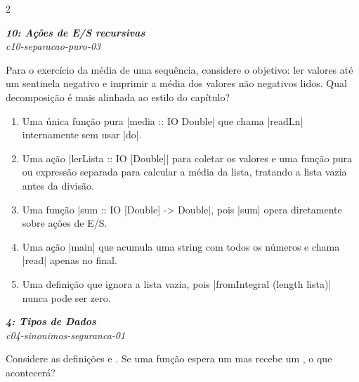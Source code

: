 \documentclass[a4paper,10pt,brazil]{article}
\begin{document}
\begin{multicols}{2}
\begin{enumerate}
\end{enumerate}

\begin{flushright}
  \footnotesize
  \textit{\textbf{10: Ações de E/S recursivas}}\\
  \textit{c10-separacao-puro-03}\\

\end{flushright}
Para o exercício da média de uma sequência, considere o objetivo: ler valores até um sentinela negativo e imprimir a média dos valores não negativos lidos. Qual decomposição é mais alinhada ao estilo do capítulo?

\begin{enumerate}
  \item Uma única função pura \haskellinline|media :: IO Double| que chama \haskellinline|readLn| internamente sem usar \haskellinline|do|.

  \item Uma ação \haskellinline|lerLista :: IO [Double]| para coletar os valores e uma função pura ou expressão separada para calcular a média da lista, tratando a lista vazia antes da divisão.

  \item Uma função \haskellinline|sum :: IO [Double] -> Double|, pois \haskellinline|sum| opera diretamente sobre ações de E/S.

  \item Uma ação \haskellinline|main| que acumula uma string com todos os números e chama \haskellinline|read| apenas no final.

  \item Uma definição que ignora a lista vazia, pois \haskellinline|fromIntegral (length lista)| nunca pode ser zero.


\end{enumerate}

\begin{flushright}
  \footnotesize
  \textit{\textbf{4: Tipos de Dados}}\\
  \textit{c04-sinonimos-seguranca-01}\\

\end{flushright}
Considere as definições  e . Se uma função espera um  mas recebe um , o que acontecerá?


\end{multicols}
\end{document}
